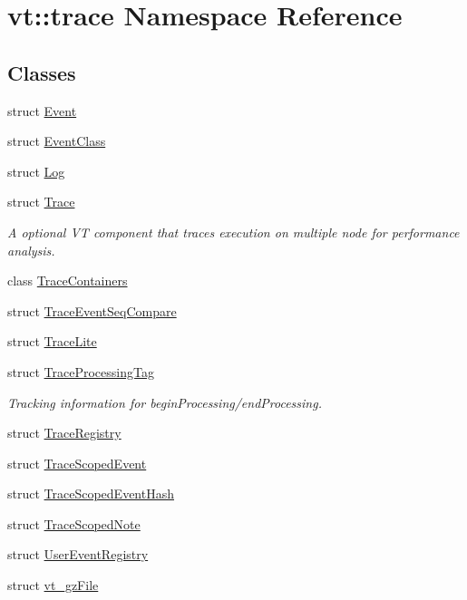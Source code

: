 \hypertarget{namespacevt_1_1trace}{}\section{vt\+:\+:trace Namespace Reference}
\label{namespacevt_1_1trace}
\subsection*{Classes}
\begin{DoxyCompactItemize}
\item 
struct \hyperlink{structvt_1_1trace_1_1_event}{Event}
\item 
struct \hyperlink{structvt_1_1trace_1_1_event_class}{Event\+Class}
\item 
struct \hyperlink{structvt_1_1trace_1_1_log}{Log}
\item 
struct \hyperlink{structvt_1_1trace_1_1_trace}{Trace}
\begin{DoxyCompactList}\small\item\em A optional VT component that traces execution on multiple node for performance analysis. \end{DoxyCompactList}\item 
class \hyperlink{classvt_1_1trace_1_1_trace_containers}{Trace\+Containers}
\item 
struct \hyperlink{structvt_1_1trace_1_1_trace_event_seq_compare}{Trace\+Event\+Seq\+Compare}
\item 
struct \hyperlink{structvt_1_1trace_1_1_trace_lite}{Trace\+Lite}
\item 
struct \hyperlink{structvt_1_1trace_1_1_trace_processing_tag}{Trace\+Processing\+Tag}
\begin{DoxyCompactList}\small\item\em Tracking information for begin\+Processing/end\+Processing. \end{DoxyCompactList}\item 
struct \hyperlink{structvt_1_1trace_1_1_trace_registry}{Trace\+Registry}
\item 
struct \hyperlink{structvt_1_1trace_1_1_trace_scoped_event}{Trace\+Scoped\+Event}
\item 
struct \hyperlink{structvt_1_1trace_1_1_trace_scoped_event_hash}{Trace\+Scoped\+Event\+Hash}
\item 
struct \hyperlink{structvt_1_1trace_1_1_trace_scoped_note}{Trace\+Scoped\+Note}
\item 
struct \hyperlink{structvt_1_1trace_1_1_user_event_registry}{User\+Event\+Registry}
\item 
struct \hyperlink{structvt_1_1trace_1_1vt__gz_file}{vt\+\_\+gz\+File}
\end{DoxyCompactItemize}
